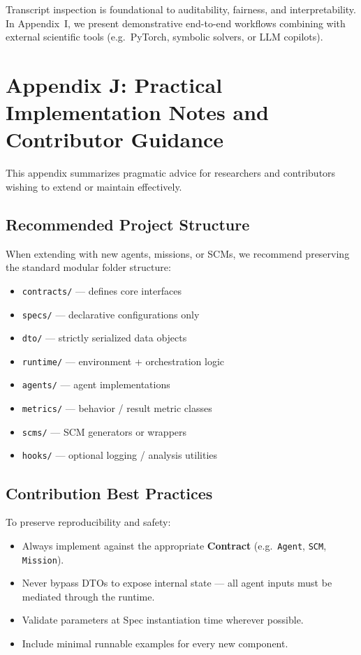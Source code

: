 \bigskip
Transcript inspection is foundational to auditability, fairness, and interpretability.  
In Appendix~I, we present demonstrative end-to-end workflows combining \game with external scientific tools (e.g.\ PyTorch, symbolic solvers, or LLM copilots).

\section{Appendix J: Practical Implementation Notes and Contributor Guidance}
\label{appendix:implementation_notes}

This appendix summarizes pragmatic advice for researchers and contributors wishing to extend or maintain \game effectively.

\subsection{Recommended Project Structure}
When extending with new agents, missions, or SCMs, we recommend preserving the standard modular folder structure:
\begin{itemize}
    \item \texttt{contracts/} — defines core interfaces
    \item \texttt{specs/} — declarative configurations only
    \item \texttt{dto/} — strictly serialized data objects
    \item \texttt{runtime/} — environment + orchestration logic
    \item \texttt{agents/} — agent implementations
    \item \texttt{metrics/} — behavior / result metric classes
    \item \texttt{scms/} — SCM generators or wrappers
    \item \texttt{hooks/} — optional logging / analysis utilities
\end{itemize}

\subsection{Contribution Best Practices}
To preserve reproducibility and safety:
\begin{itemize}
    \item Always implement against the appropriate \textbf{Contract} (e.g.\ \texttt{Agent}, \texttt{SCM}, \texttt{Mission}).
    \item Never bypass DTOs to expose internal state — all agent inputs must be mediated through the runtime.
    \item Validate parameters at Spec instantiation time wherever possible.
    \item Include minimal runnable examples for every new component.
\end{itemize}

